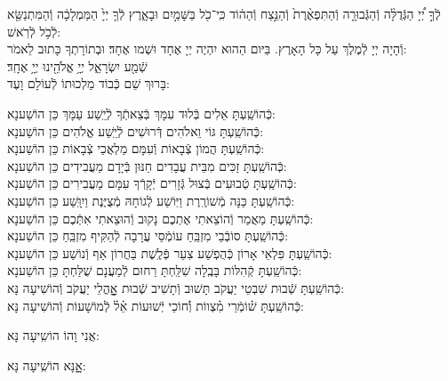 \documentclass[twoside, openany, parskip=half, 11pt]{book}
\begin{document}
לְֿךָ֣ יְ֠יָ הַגְּֿדֻלָּ֨ה וְֿהַגְּֿבוּרָ֤ה וְֿהַתִּפְאֶ֨רֶת֙ וְֿהַנֵּ֣צַח וְֿהַה֔וֹד
כִּֽי־כֹ֖ל בַּשָּׁמַ֣יִם וּבָאָ֑רֶץ לְֿךָ֤ יְיָ֙ הַמַּמְלָכָ֔ה
וְֿהַמִּתְנַשֵּׂ֖א לְֿכֹ֥ל לְֿרֹֽאשׁ:\\
וְֿהָיָה יְיָ לְֿמֶלֶךְ עַל כָּל הָאָרֶץ. בַּיּום הַהוּא יִהְיֶה יְיָ אֶחָד וּשְׁמו אֶחָד׃ וּבְתוֹרָתְךָ כָּתוּב לֵאמֹר: \\
שְֿׁמַ֖ע יִשְׂרָאֵ֑ל יְיָ֥ אֱלֹהֵ֖ינוּ יְיָ֥ אֶחָֽד׃\\
בָּרוּךְ שֵׁם כְּֿבוֹד מַלְכוּתוֹ לְֿעוֹלָם וָעֶד:

\begin{small}
כְּֿהוֹשַֽׁעְתָּ אֵלִים בְּֿלוּד עִמָּךְ בְּֿצֵאתְֿךָ לְֿיֵֽשַׁע עַמָּךְ \hfill כֵּן הוֹשַׁענָא: \\
כְּֿהוֹשַֽׁעְתָּ גּוֹי וֵאלֹהִים דְּֿרוּשִׁים לְֿיֵֽשַׁע אֱלֹהִים \hfill כֵּן הוֹשַׁענָא: \\
כְּֿהוֹשַֽׁעְתָּ הֲמוֹן צְֿבָאוֹת וְֿעִמָּם מַלְאֲכֵי צְֿבָאוֹת \hfill כֵּן הוֹשַׁענָא: \\
כְּֿהוֹשַֽׁעְתָּ זַכִּים מִבֵּית עֲבָדִים חַנּוּן בְּֿיָדָם מַעֲבִידִים \hfill כֵּן הוֹשַׁענָא: \\
כְּֿהוֹשַֽׁעְתָּ טְֿבוּעִים בְּֿצוּל גְּֿזָרִים יְֿקָרְֿךָ עִמָּם מַעֲבִירִים \hfill כֵּן הוֹשַׁענָא: \\
כְּֿהוֹשַֽׁעְתָּ כַּנָּה מְֿשׁוֹרֶֽרֶת וַיּֽוֹשַׁע לְֿגוֹחָהּ מְֿצֻיֶּנֶת וַיִוָּֽשַׁע \hfill כֵּן הוֹשַׁענָא: \\
כְּֿהוֹשַֽׁעְתָּ מַאֲמַר וְֿהוֹצֵאתִי אֶתְכֶם נָקוּב וְֿהוּצֵאתִי אִתְּֿכֶם \hfill כֵּן הוֹשַׁענָא:\\
כְּֿהוֹשַֽׁעְתָּ סוֹבְֿבֵי מִזְבֵּֽחַ עוֹמְֿסֵי עֲרָבָה לְֿהַקִּיף מִזְבֵּֽחַ \hfill כֵּן הוֹשַׁענָא: \\
כְּֿהוֹשַֽׁעְתָּ פִּלְאֵי אָרוֹן כְּֿהֻפְשַׁע צִעֵר פְּֿלֶֽשֶׁת בַּחֲרוֹן אַף וְֿנוֹשַׁע \hfill כֵּן הוֹשַׁענָא: \\
כְּֿהוֹשַֽׁעְתָּ קְֿהִלּוֹת בָּבֶֽלָה שִׁלַּֽחְתָּ רַחוּם לְֿמַעֲנָם שֻׁלַּחְתָּ \hfill כֵּן הוֹשַׁענָא:\\
כְּֿהוֹשַֽׁעְתָּ שְֿׁבוּת שִׁבְטֵי יַעֲקֹב תָּשׁוּב וְֿתָשִׁיב שְֿׁבוּת אׇׇׇׇָהֳלֵי יַעֲקֹב \hfill וְֿהוֹשִׁיעָה נָּא:\\
כְּֿהוֹשַֽׁעְתָּ שׁ֗וֹמְֿרֵי מִ֗צְווֹת וְֿ֗חוֹכֵי יְֿשׁוּעוֹת אֵ֗ל֗ לְֿמוֹשָׁעוֹת \hfill וְֿהוֹשִׁיעָה נָּא:

\end{small}

\begin{large}
\chazzan
אֲנִי וָהוֹ הוֹשִֽיעָה נָּא:

\shatzvkahal
אׇׇָנָּא הוֹשִֽׁיעָה נָּא:

\end{large}
\end{document}
